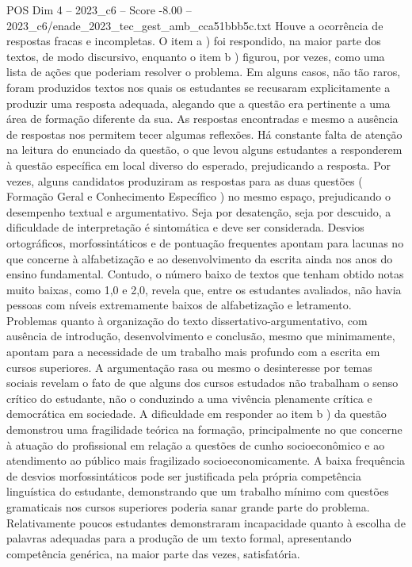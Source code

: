\begin{textsample}{POS Dim 4 – 2023\_c6 – Score -8.00 – 2023\_c6/enade\_2023\_tec\_gest\_amb\_cca51bbb5c.txt}
Houve a ocorrência de respostas fracas e incompletas.
O item a ) foi respondido, na maior parte dos textos, de modo discursivo, enquanto o item b ) figurou, por vezes, como uma lista de ações que poderiam resolver o problema.
Em alguns casos, não tão raros, foram produzidos textos nos quais os estudantes se recusaram explicitamente a produzir uma resposta adequada, alegando que a questão era pertinente a uma área de formação diferente da sua.
As respostas encontradas e mesmo a ausência de respostas nos permitem tecer algumas reflexões.
Há constante falta de atenção na leitura do enunciado da questão, o que levou alguns estudantes a responderem à questão específica em local diverso do esperado, prejudicando a resposta.
Por vezes, alguns candidatos produziram as respostas para as duas questões ( Formação Geral e Conhecimento Específico ) no mesmo espaço, prejudicando o desempenho textual e argumentativo.
Seja por desatenção, seja por descuido, a dificuldade de interpretação é sintomática e deve ser considerada.
Desvios ortográficos, morfossintáticos e de pontuação frequentes apontam para lacunas no que concerne à alfabetização e ao desenvolvimento da escrita ainda nos anos do ensino fundamental.
Contudo, o número baixo de textos que tenham obtido notas muito baixas, como 1,0 e 2,0, revela que, entre os estudantes avaliados, não havia pessoas com níveis extremamente baixos de alfabetização e letramento.
Problemas quanto à organização do texto dissertativo-argumentativo, com ausência de introdução, desenvolvimento e conclusão, mesmo que minimamente, apontam para a necessidade de um trabalho mais profundo com a escrita em cursos superiores.
A argumentação rasa ou mesmo o desinteresse por temas sociais revelam o fato de que alguns dos cursos estudados não trabalham o senso crítico do estudante, não o conduzindo a uma vivência plenamente crítica e democrática em sociedade.
A dificuldade em responder ao item b ) da questão demonstrou uma fragilidade teórica na formação, principalmente no que concerne à atuação do profissional em relação a questões de cunho socioeconômico e ao atendimento ao público mais fragilizado socioeconomicamente.
A baixa frequência de desvios morfossintáticos pode ser justificada pela própria competência linguística do estudante, demonstrando que um trabalho mínimo com questões gramaticais nos cursos superiores poderia sanar grande parte do problema.
Relativamente poucos estudantes demonstraram incapacidade quanto à escolha de palavras adequadas para a produção de um texto formal, apresentando competência genérica, na maior parte das vezes, satisfatória.

\end{textsample}
